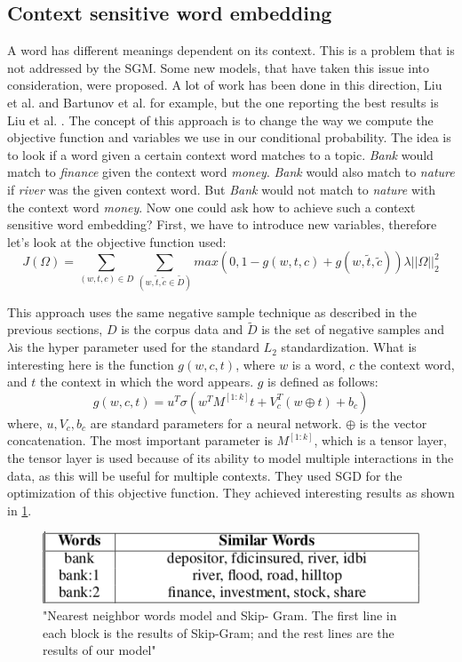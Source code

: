 \subsection{Context sensitive word embedding}
A word has different meanings dependent on its context. This is a problem that is not addressed by the SGM. Some new models, that have taken this issue into consideration, were proposed. A lot of work has been done in this direction, Liu et al.\cite{topicalWE} and Bartunov et al.\cite{breaking} for example, but the one reporting the best results is Liu et al. \cite{contextWithTensor}. The concept of this approach is to change the way we compute the objective function and variables we use in our conditional probability. The idea is to look if a word given a certain context word matches to a topic. \textit{Bank} would match to \textit{finance} given the context word \textit{money}. \textit{Bank} would also match to \textit{nature} if \textit{river} was the given context word. But \textit{Bank} would not match to \textit{nature} with the context word \textit{money}. Now one could ask how to achieve such a context sensitive word embedding? First, we have to introduce new variables, therefore let's look at the objective function used:
\begin{equation}
J(\Omega) = \sum_{(w,t,c)\in D} \sum_{(w,\tilde{t},\tilde{c} \in{\tilde{D}})} max(0,1- g(w,t,c) + g(w,\tilde{t},\tilde{c})) \lambda||\Omega||_{2}^2
\end{equation}

This approach uses the same negative sample technique as described in the previous sections, $D$ is the corpus data and $\tilde{D}$ is the set of negative samples and $\lambda$is the hyper parameter used for the standard $L_2$ standardization. What is interesting here is the function $g(w,c,t)$, where $w$ is a word, $c$ the context word, and $t$ the context in which the word appears. $g$ is defined as follows:
\begin{equation}
g(w,c,t) = u^T \sigma(w^TM^{[1:k]}t+V_c^T(w \oplus t) + b_c)
\end{equation}
where, $u, V_c, b_c$ are standard parameters for a neural network. $\oplus$ is the vector concatenation. The most important parameter is $M^{[1:k]}$, which is a tensor layer, the tensor layer is used because of its ability to model multiple interactions in the data, as this will be useful for multiple contexts. They used SGD for the optimization of this objective function. They achieved interesting results as shown in \ref{fig:multipleContext}.\\
\begin{figure}[ht]
\centering
\includegraphics[scale=0.7]{images/multipleContext.png}
\caption{"Nearest neighbor words model and Skip-
Gram. The first line in each block is the results of Skip-Gram;
and the rest lines are the results of our model" \cite{contextWithTensor}}
\label{fig:multipleContext}
\end{figure}

